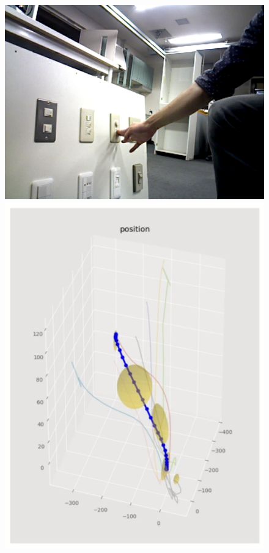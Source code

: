 \begin{figure}[htbp]
  \begin{minipage}{0.40\hsize}
    \begin{center}
      \includegraphics[clip,width=\linewidth]{./figs/push_button.png}
    \end{center}
  \end{minipage}
  \begin{minipage}{0.60\hsize}
    \begin{center}
      \begin{minipage}{0.45\hsize}
        \begin{center}
          \includegraphics[clip,width=\hsize]{./figs/push_button_repro1.png}

\end{center}
\end{minipage}
\end{center}
\end{minipage}
\end{figure}
